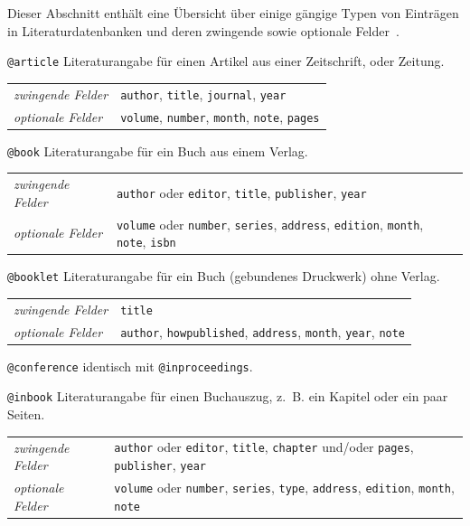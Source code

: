 \documentclass[a4paper,10pt,twoside]{scrbook}
\begin{document}
Dieser Abschnitt enthält eine Übersicht über einige gängige Typen von Einträgen in Literaturdatenbanken und deren zwingende sowie optionale Felder~\cite{bibtexWikipediaWebseite,Wikibooks_LaTeX_Kompendium}.

\verb!@article! Literaturangabe für einen Artikel aus einer Zeitschrift, oder Zeitung.

\begin{tabular}{p{2.8cm}p{10cm}}
	 \textsl{zwingende Felder} & \texttt{author}, \texttt{title}, \texttt{journal}, \texttt{year}\\
	 \textsl{optionale Felder} & \texttt{volume}, \texttt{number}, \texttt{month}, \texttt{note}, \texttt{pages}\\
\end{tabular}

\verb!@book! Literaturangabe für ein Buch aus einem Verlag.

\begin{tabular}{p{2.8cm}p{10cm}}
	 \textsl{zwingende Felder} & \texttt{author} oder \texttt{editor}, \texttt{title}, \texttt{publisher}, \texttt{year}\\
	 \textsl{optionale Felder} & \texttt{volume} oder \texttt{number}, \texttt{series}, \texttt{address}, \texttt{edition}, \texttt{month}, \texttt{note}, \texttt{isbn} \\
\end{tabular}

\verb!@booklet! Literaturangabe für ein Buch (gebundenes Druckwerk) ohne Verlag.

\begin{tabular}{p{2.8cm}p{10cm}}
	 \textsl{zwingende Felder} & \texttt{title}\\
	 \textsl{optionale Felder} & \texttt{author}, \texttt{howpublished}, \texttt{address}, \texttt{month}, \texttt{year}, \texttt{note}\\
\end{tabular}

\verb!@conference! identisch mit \verb!@inproceedings!.

\verb!@inbook! Literaturangabe für einen Buchauszug, z.~B. 
ein Kapitel oder ein paar Seiten.

\begin{tabular}{p{2.8cm}p{10cm}}
	 \textsl{zwingende Felder} & \texttt{author} oder \texttt{editor}, \texttt{title}, \texttt{chapter} und/oder \texttt{pages}, \texttt{publisher}, \texttt{year}\\
	 \textsl{optionale Felder} & \texttt{volume} oder \texttt{number}, \texttt{series}, \texttt{type}, \texttt{address}, \texttt{edition}, \texttt{month}, \texttt{note}\\
\end{tabular}
\end{document}
